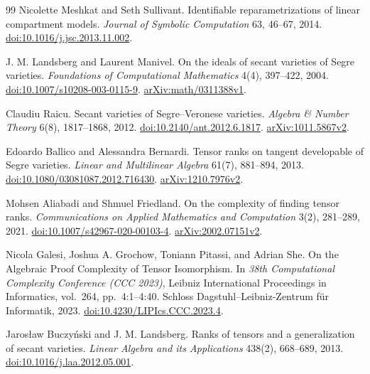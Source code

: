 \begin{thebibliography}{99}
Nicolette Meshkat and Seth Sullivant.
Identifiable reparametrizations of linear compartment models.
\emph{Journal of Symbolic Computation} 63, 46--67, 2014.
\href{https://doi.org/10.1016/j.jsc.2013.11.002}{doi:10.1016/j.jsc.2013.11.002}.


J. M. Landsberg and Laurent Manivel.
On the ideals of secant varieties of Segre varieties.
\emph{Foundations of Computational Mathematics} 4(4), 397--422, 2004.
\href{https://doi.org/10.1007/s10208-003-0115-9}{doi:10.1007/s10208-003-0115-9}.
\href{https://arxiv.org/abs/math/0311388v1}{arXiv:math/0311388v1}.

Claudiu Raicu.
Secant varieties of Segre--Veronese varieties.
\emph{Algebra \& Number Theory} 6(8), 1817--1868, 2012.
\href{https://doi.org/10.2140/ant.2012.6.1817}{doi:10.2140/ant.2012.6.1817}.
\href{https://arxiv.org/abs/1011.5867v2}{arXiv:1011.5867v2}.

Edoardo Ballico and Alessandra Bernardi.
Tensor ranks on tangent developable of Segre varieties.
\emph{Linear and Multilinear Algebra} 61(7), 881--894, 2013.
\href{https://doi.org/10.1080/03081087.2012.716430}{doi:10.1080/03081087.2012.716430}.
\href{https://arxiv.org/abs/1210.7976v2}{arXiv:1210.7976v2}.

Mohsen Aliabadi and Shmuel Friedland.
On the complexity of finding tensor ranks.
\emph{Communications on Applied Mathematics and Computation} 3(2), 281--289, 2021.
\href{https://doi.org/10.1007/s42967-020-00103-4}{doi:10.1007/s42967-020-00103-4}.
\href{https://arxiv.org/abs/2002.07151v2}{arXiv:2002.07151v2}.

Nicola Galesi, Joshua A. Grochow, Toniann Pitassi, and Adrian She.
On the Algebraic Proof Complexity of Tensor Isomorphism.
In \emph{38th Computational Complexity Conference (CCC 2023)},
Leibniz International Proceedings in Informatics, vol.\ 264, pp.\ 4:1--4:40. Schloss Dagstuhl--Leibniz-Zentrum f\"ur Informatik, 2023.
\href{https://doi.org/10.4230/LIPIcs.CCC.2023.4}{doi:10.4230/LIPIcs.CCC.2023.4}.

Jaros{\l}aw Buczy\'nski and J. M. Landsberg.
Ranks of tensors and a generalization of secant varieties.
\emph{Linear Algebra and its Applications} 438(2), 668--689, 2013.
\href{https://doi.org/10.1016/j.laa.2012.05.001}{doi:10.1016/j.laa.2012.05.001}.

\end{thebibliography}
